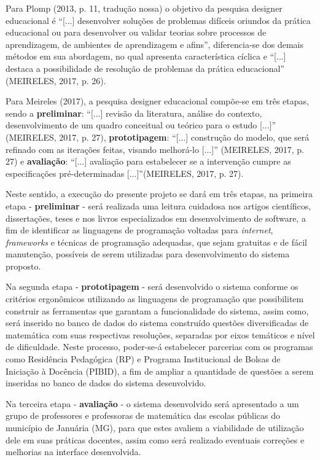 \documentclass{IFNMG}
\begin{document}
Para Plomp (2013, p. 11, tradução nossa) o objetivo da pesquisa designer educacional é “[...] desenvolver soluções de problemas difíceis oriundos da prática educacional ou para desenvolver ou validar teorias sobre processos de aprendizagem, de ambientes de aprendizagem e afins”, diferencia-se dos demais métodos em sua abordagem, no qual apresenta característica cíclica e “[...] destaca a possibilidade de resolução de problemas da prática educacional” (MEIRELES, 2017, p. 26).

Para Meireles (2017), a pesquisa designer educacional compõe-se em três etapas, sendo a \textbf{preliminar}: “[...] revisão da literatura, análise do contexto, desenvolvimento de um quadro conceitual ou teórico para o estudo [...]” (MEIRELES, 2017, p. 27), \textbf{prototipagem}: “[...] construção do modelo, que será refinado com as iterações feitas, visando melhorá-lo [...]” (MEIRELES, 2017, p. 27) e \textbf{avaliação}: “[...] avaliação para estabelecer se a intervenção cumpre as especificações pré-determinadas [...]”(MEIRELES, 2017, p. 27).

Neste sentido, a execução do presente projeto se dará em três etapas, na primeira etapa - \textbf{preliminar} - será realizada uma leitura cuidadosa nos artigos científicos, dissertações, teses e nos livros especializados em desenvolvimento de software, a fim de  identificar as linguagens de programação voltadas para \textit{internet}, \textit{frameworks} e técnicas de programação adequadas, que sejam gratuitas e de fácil manutenção, possíveis de serem utilizadas para desenvolvimento do sistema proposto.

Na segunda etapa - \textbf{prototipagem} - será desenvolvido o sistema conforme os critérios ergonômicos utilizando as linguagens de programação que possibilitem construir as ferramentas que garantam a funcionalidade do sistema, assim como, será inserido no banco de dados do sistema construído questões diversificadas de matemática com suas respectivas resoluções, separadas por eixos temáticos e nível de dificuldade. Neste processo, poder-se-á estabelecer parcerias com os programas como Residência Pedagógica (RP) e Programa Institucional de Bolsas de Iniciação à Docência (PIBID), a fim de ampliar a quantidade de questões a serem inseridas no banco de dados do sistema desenvolvido.

Na terceira etapa - \textbf{avaliação} - o sistema desenvolvido será apresentado a um grupo de professores e professoras de matemática das escolas públicas do município de Januária (MG), para que estes avaliem a viabilidade de utilização dele em suas práticas docentes, assim como será realizado eventuais correções e melhorias na interface desenvolvida.
\end{document}
